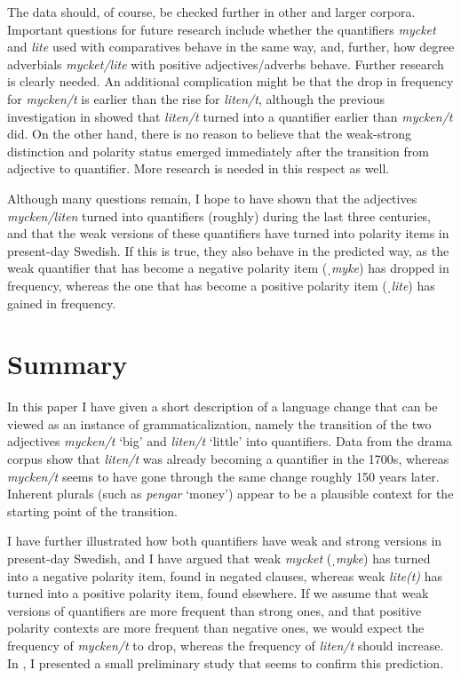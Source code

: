 \documentclass[output=paper]{langscibook}
\begin{document}
The data should, of course, be checked further in other and larger corpora. Important questions for future research include whether the quantifiers \textit{mycket} and \textit{lite} used with comparatives behave in the same way, and, further, how degree adverbials \textit{mycket/lite} with positive adjectives/adverbs behave. Further research is clearly needed. An additional complication might be that the drop in frequency for \textit{mycken/t} is earlier than the rise for \textit{liten/t}, although the previous investigation in  showed that \textit{liten/t} turned into a quantifier earlier than \textit{mycken/t} did. On the other hand, there is no reason to believe that the weak-strong distinction and polarity status emerged immediately after the transition from adjective to quantifier. More research is needed in this respect as well.



Although many questions remain, I hope to have shown that the adjectives \textit{mycken/liten} turned into quantifiers (roughly) during the last three centuries, and that the weak versions of these quantifiers have turned into polarity items in present-day Swedish. If this is true, they also behave in the predicted way, as the weak quantifier that has become a negative polarity item (\textit{ˌmyke}) has dropped in frequency, whereas the one that has become a positive polarity item (\textit{ˌlite}) has gained in frequency.


\section{Summary}\label{sec:delsing:7}


In this paper I have given a short description of a language change that can be viewed as an instance of grammaticalization, namely the transition of the two adjectives \textit{mycken/t} ‘big’ and \textit{liten/t} ‘little’ into quantifiers. Data from the drama corpus show that \textit{liten/t} was already becoming a quantifier in the 1700s, whereas \textit{mycken/t} seems to have gone through the same change roughly 150 years later. Inherent plurals (such as \textit{pengar} ‘money’) appear to be a plausible context for the starting point of the transition.



I have further illustrated how both quantifiers have weak and strong versions in present-day Swedish, and I have argued that weak \textit{mycket} (\textit{ˌmyke}) has turned into a negative polarity item, found in negated clauses, whereas weak \textit{lite(t)} has turned into a positive polarity item, found elsewhere. If we assume that weak versions of quantifiers are more frequent than strong ones, and that positive polarity contexts are more frequent than negative ones, we would expect the frequency of \textit{mycken/t} to drop, whereas the frequency of \textit{liten/t} should increase. In , I presented a small preliminary study that seems to confirm this prediction.
\end{document}
